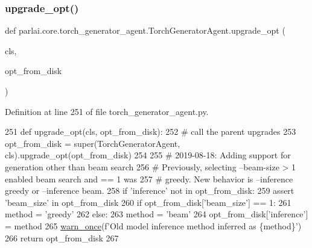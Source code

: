 \subsubsection{\texorpdfstring{upgrade\+\_\+opt()}{upgrade\_opt()}}
{\footnotesize\ttfamily def parlai.\+core.\+torch\+\_\+generator\+\_\+agent.\+Torch\+Generator\+Agent.\+upgrade\+\_\+opt (\begin{DoxyParamCaption}\item[{}]{cls,  }\item[{}]{opt\+\_\+from\+\_\+disk }\end{DoxyParamCaption})}



Definition at line 251 of file torch\+\_\+generator\+\_\+agent.\+py.


\begin{DoxyCode}
251     \textcolor{keyword}{def }upgrade\_opt(cls, opt\_from\_disk):
252         \textcolor{comment}{# call the parent upgrades}
253         opt\_from\_disk = super(TorchGeneratorAgent, cls).upgrade\_opt(opt\_from\_disk)
254 
255         \textcolor{comment}{# 2019-08-18: Adding support for generation other than beam search}
256         \textcolor{comment}{# Previously, selecting --beam-size > 1 enabled beam search and == 1 was}
257         \textcolor{comment}{# greedy. New behavior is --inference greedy or --inference beam.}
258         \textcolor{keywordflow}{if} \textcolor{stringliteral}{'inference'} \textcolor{keywordflow}{not} \textcolor{keywordflow}{in} opt\_from\_disk:
259             \textcolor{keyword}{assert} \textcolor{stringliteral}{'beam\_size'} \textcolor{keywordflow}{in} opt\_from\_disk
260             \textcolor{keywordflow}{if} opt\_from\_disk[\textcolor{stringliteral}{'beam\_size'}] == 1:
261                 method = \textcolor{stringliteral}{'greedy'}
262             \textcolor{keywordflow}{else}:
263                 method = \textcolor{stringliteral}{'beam'}
264             opt\_from\_disk[\textcolor{stringliteral}{'inference'}] = method
265             \hyperlink{namespaceparlai_1_1utils_1_1misc_acf146e70ea7f6867969a7c2b545d4b4b}{warn\_once}(f\textcolor{stringliteral}{'Old model inference method inferred as \{method\}'})
266         \textcolor{keywordflow}{return} opt\_from\_disk
267 
\end{DoxyCode}
\mbox{\label{classparlai_1_1core_1_1torch__generator__agent_1_1TorchGeneratorAgent_a66f36d7201bc1b9a019d3525a5934cf7}} 
